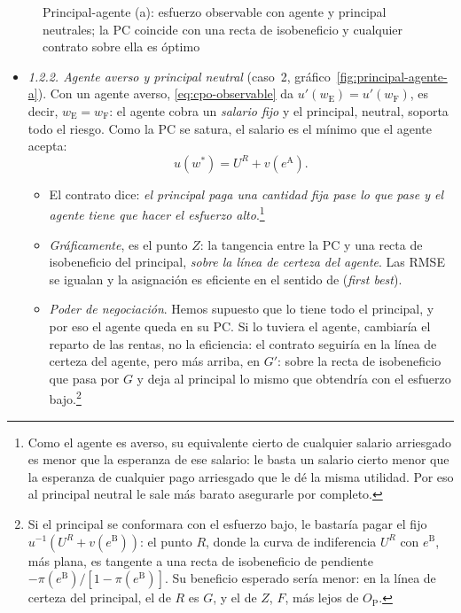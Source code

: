 \documentclass[11pt]{article}
\begin{document}
\begin{figure}[H]
\centering
\caption{Principal-agente (a): esfuerzo observable con agente y principal neutrales; la PC coincide con una recta de isobeneficio y cualquier contrato sobre ella es óptimo}\label{fig:pa-neutrales-a}
\end{figure}

\begin{itemize}
\item \emph{1.2.2. Agente averso y principal neutral} (caso~2, gráfico~\ref{fig:principal-agente-a}). Con un agente averso, \eqref{eq:cpo-observable} da $u'(w_{\mathrm{E}})=u'(w_{\mathrm{F}})$, es decir, $w_{\mathrm{E}}=w_{\mathrm{F}}$: el agente cobra un \emph{salario fijo} y el principal, neutral, soporta todo el riesgo. Como la PC se satura, el salario es el mínimo que el agente acepta:
  \begin{equation}
  u(w^*)=U^R+v(e^{\mathrm{A}}).
  \end{equation}
  \begin{itemize}
  \item El contrato dice: \emph{el principal paga una cantidad fija pase lo que pase y el agente tiene que hacer el esfuerzo alto}.\footnote{Como el agente es averso, su equivalente cierto de cualquier salario arriesgado es menor que la esperanza de ese salario: le basta un salario cierto menor que la esperanza de cualquier pago arriesgado que le dé la misma utilidad. Por eso al principal neutral le sale más barato asegurarle por completo.}
  \item \emph{Gráficamente}, es el punto $Z$: la tangencia entre la PC y una recta de isobeneficio del principal, \emph{sobre la línea de certeza del agente}. Las RMSE se igualan y la asignación es eficiente en el sentido de  (\emph{first best}).
  \item \emph{Poder de negociación}. Hemos supuesto que lo tiene todo el principal, y por eso el agente queda en su PC. Si lo tuviera el agente, cambiaría el reparto de las rentas, no la eficiencia: el contrato seguiría en la línea de certeza del agente, pero más arriba, en $G'$: sobre la recta de isobeneficio que pasa por $G$ y deja al principal lo mismo que obtendría con el esfuerzo bajo.\footnote{Si el principal se conformara con el esfuerzo bajo, le bastaría pagar el fijo $u^{-1}(U^R+v(e^{\mathrm{B}}))$: el punto $R$, donde la curva de indiferencia $U^R$ con $e^{\mathrm{B}}$, más plana, es tangente a una recta de isobeneficio de pendiente $-\pi(e^{\mathrm{B}})/[1-\pi(e^{\mathrm{B}})]$. Su beneficio esperado sería menor: en la línea de certeza del principal, el de $R$ es $G$, y el de $Z$, $F$, más lejos de $O_{\mathrm{P}}$.}
  \end{itemize}
\end{itemize}
\end{document}
